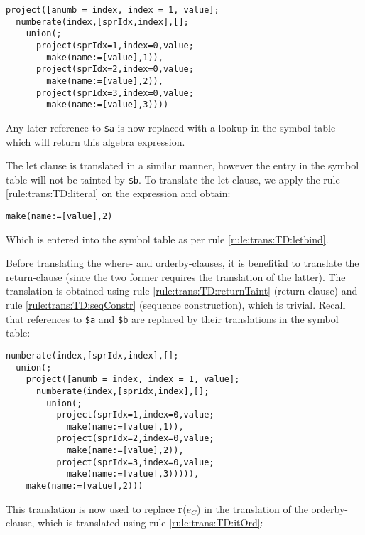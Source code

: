 \begin{Verbatim}
project([anumb = index, index = 1, value];
  numberate(index,[sprIdx,index],[];
    union(;
      project(sprIdx=1,index=0,value;
        make(name:=[value],1)),
      project(sprIdx=2,index=0,value;
        make(name:=[value],2)),
      project(sprIdx=3,index=0,value;
        make(name:=[value],3))))
\end{Verbatim}

Any later reference to \texttt{\$a} is now replaced with a lookup in the symbol
table which will return this algebra expression.

The let clause is translated in a similar manner, however the entry in the
symbol table will not be tainted by \texttt{\$b}. To translate the let-clause,
we apply the rule \ref{rule:trans:TD:literal} on the expression and obtain:

\begin{Verbatim}
make(name:=[value],2)
\end{Verbatim}

Which is entered into the symbol table as per rule \ref{rule:trans:TD:letbind}.

Before translating the where- and orderby-clauses, it is benefitial to
translate the return-clause (since the two former requires the translation of
the latter). The translation is obtained using rule
\ref{rule:trans:TD:returnTaint} (return-clause) and rule
\ref{rule:trans:TD:seqConstr} (sequence construction), which is trivial. Recall
that references to \texttt{\$a} and \texttt{\$b} are replaced by their
translations in the symbol table:

\begin{Verbatim}
numberate(index,[sprIdx,index],[];
  union(;
    project([anumb = index, index = 1, value];
      numberate(index,[sprIdx,index],[];
        union(;
          project(sprIdx=1,index=0,value;
            make(name:=[value],1)),
          project(sprIdx=2,index=0,value;
            make(name:=[value],2)),
          project(sprIdx=3,index=0,value;
            make(name:=[value],3))))),
    make(name:=[value],2)))
\end{Verbatim}

This translation is now used to replace \textbf{r}($e_C$) in the translation
of the orderby-clause, which is translated using rule \ref{rule:trans:TD:itOrd}:

